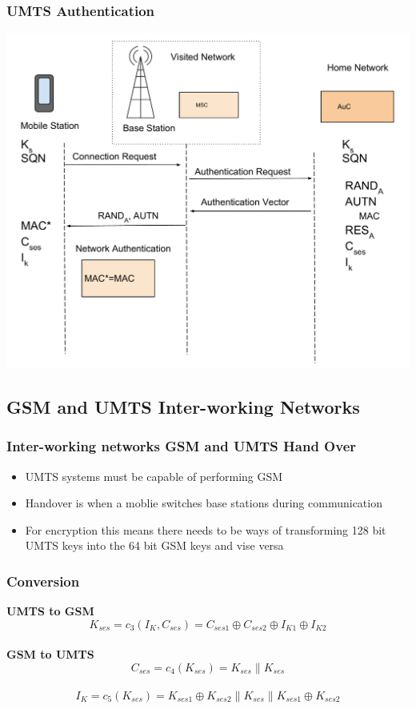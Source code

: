 \documentclass{beamer}
\begin{document}
	\begin{frame}
	\frametitle{UMTS Authentication}
  \begin{center}
  \includegraphics[width=.9\textwidth, height=.85\textheight]{Images/UMTSAuthentication3.pdf}

  \end{center} 
	\end{frame}
\subsection{GSM and UMTS Inter-working Networks}

	\begin{frame}
	
	\frametitle{Inter-working networks GSM and UMTS Hand Over}
	\begin{itemize}
		\item UMTS systems must be capable of performing GSM
		\item Handover is when a moblie switches base stations during communication
		\item For encryption this means there needs to be ways of transforming 128 bit UMTS keys into the 64 bit GSM keys and vise versa
	\end{itemize}
	\end{frame}
	\begin{frame}
		\frametitle{Conversion}
		\textbf{UMTS to GSM}
		\begin{equation}
			\label{C_3}
			\mathit{K_{ses} = c_{3}(I_{K},C_{ses}) = C_{ses1} \oplus 					C_{ses2}\oplus I_{K1} \oplus I_{K2}}
		\end{equation}\\
		\textbf{GSM to UMTS}
		\begin{equation} 
			\label{C_4}
			\mathit{C_{ses} = c_{4}(K_{ses}) = K_{ses} \| K_{ses}}
		\end{equation}\\

		\begin{equation}
			\label{C_5}
			\mathit{I_{K} = c_{5}(K_{ses}) = K_{ses1}\oplus K_{ses2}\|					K_{ses}\|K_{ses1}\oplus K_{ses2}}
		\end{equation}
	
\end{frame}	
		
\end{document}

